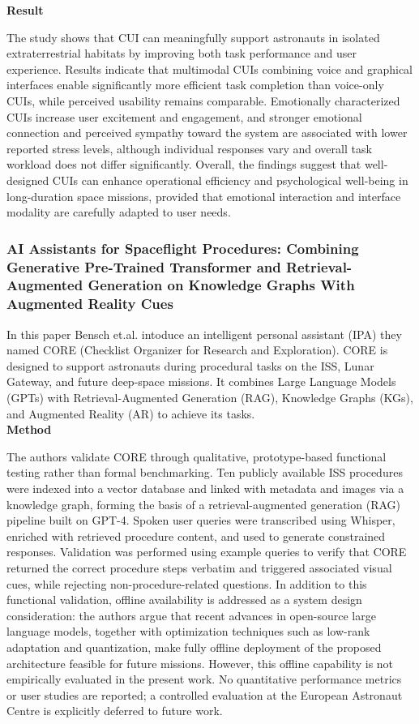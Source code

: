 \textbf{Result}

The study shows that CUI can meaningfully support astronauts in isolated extraterrestrial habitats by improving both task performance and user experience.
Results indicate that multimodal CUIs combining voice and graphical interfaces enable significantly more efficient task completion than voice-only CUIs, while perceived usability remains comparable.
Emotionally characterized CUIs increase user excitement and engagement, and stronger emotional connection and perceived sympathy toward the system are associated with lower reported stress levels, although individual responses vary and overall task workload does not differ significantly.
Overall, the findings suggest that well-designed CUIs can enhance operational efficiency and psychological well-being in long-duration space missions, provided that emotional interaction and interface modality are carefully adapted to user needs.



\subsubsection{AI Assistants for Spaceflight Procedures: Combining Generative
Pre-Trained Transformer and Retrieval-Augmented Generation on Knowledge Graphs With Augmented Reality Cues \cite{bensch2024aiassistants}}

In this paper Bensch et.al.
intoduce an intelligent personal assistant (IPA) they named CORE (Checklist Organizer for Research and Exploration).
CORE is designed to support astronauts during procedural tasks on the ISS, Lunar Gateway, and future deep-space missions.
It combines Large Language Models (GPTs) with Retrieval-Augmented Generation (RAG), Knowledge Graphs (KGs), and Augmented Reality (AR) to achieve its tasks.
\\

\textbf{Method}

The authors validate CORE through qualitative, prototype-based functional testing rather than formal benchmarking.
Ten publicly available ISS procedures were indexed into a vector database and linked with metadata and images via a knowledge graph, forming the basis of a retrieval-augmented generation (RAG) pipeline built on GPT-4.
Spoken user queries were transcribed using Whisper, enriched with retrieved procedure content, and used to generate constrained responses.
Validation was performed using example queries to verify that CORE returned the correct procedure steps verbatim and triggered associated visual cues, while rejecting non-procedure-related questions.
In addition to this functional validation, offline availability is addressed as a system design consideration: the authors argue that recent advances in open-source large language models, together with optimization techniques such as low-rank adaptation and quantization, make fully offline deployment of the proposed architecture feasible for future missions.
However, this offline capability is not empirically evaluated in the present work.
No quantitative performance metrics or user studies are reported; a controlled evaluation at the European Astronaut Centre is explicitly deferred to future work.\\

